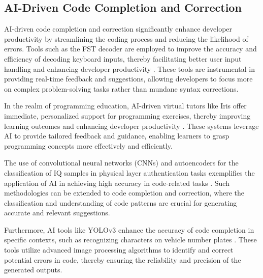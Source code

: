 
 





\subsection{AI-Driven Code Completion and Correction} \label{subsec:AI-Driven Code Completion and Correction}

AI-driven code completion and correction significantly enhance developer productivity by streamlining the coding process and reducing the likelihood of errors. Tools such as the FST decoder are employed to improve the accuracy and efficiency of decoding keyboard inputs, thereby facilitating better user input handling and enhancing developer productivity \cite{ouyang2017mobilekeyboardinputdecoding}. These tools are instrumental in providing real-time feedback and suggestions, allowing developers to focus more on complex problem-solving tasks rather than mundane syntax corrections.



In the realm of programming education, AI-driven virtual tutors like Iris offer immediate, personalized support for programming exercises, thereby improving learning outcomes and enhancing developer productivity \cite{bassner2024irisaidrivenvirtualtutor}. These systems leverage AI to provide tailored feedback and guidance, enabling learners to grasp programming concepts more effectively and efficiently.



The use of convolutional neural networks (CNNs) and autoencoders for the classification of IQ samples in physical layer authentication tasks exemplifies the application of AI in achieving high accuracy in code-related tasks \cite{oligeri2020pastaiphysicallayerauthenticationsatellite}. Such methodologies can be extended to code completion and correction, where the classification and understanding of code patterns are crucial for generating accurate and relevant suggestions.



Furthermore, AI tools like YOLOv3 enhance the accuracy of code completion in specific contexts, such as recognizing characters on vehicle number plates \cite{adak2022automaticnumberplaterecognition}. These tools utilize advanced image processing algorithms to identify and correct potential errors in code, thereby ensuring the reliability and precision of the generated outputs.



